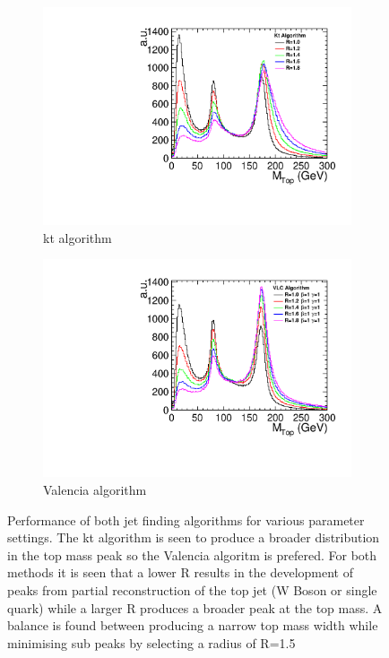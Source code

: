 \begin{figure}
  \centering
  \begin{subfigure}{.5\textwidth}
    \centering
    \includegraphics[width=1.0\textwidth]{TopAnalysis/figures/ComparisonKt.pdf}
    \caption[kt algorithm]{kt algorithm}
  \end{subfigure}%
  \begin{subfigure}{.5\textwidth}
    \centering    \includegraphics[width=1.0\textwidth]{TopAnalysis/figures/ComparisonVLC.pdf}
    \caption[Valenica algorithm]{Valencia algorithm}
  \end{subfigure}
  \caption[Performance of jet finding algorithms]{Performance of both jet finding algorithms for various parameter settings. The kt algorithm is seen to produce a broader distribution in the top mass peak so the Valencia algoritm is prefered. For both methods it is seen that a lower R results in the development of peaks from partial reconstruction of the top jet (W Boson or single quark) while a larger R produces a broader peak at the top mass. A balance is found between producing a narrow top mass width while minimising sub peaks by selecting a radius of R=1.5 }
  \label{fig:jetfinding}
\end{figure}


